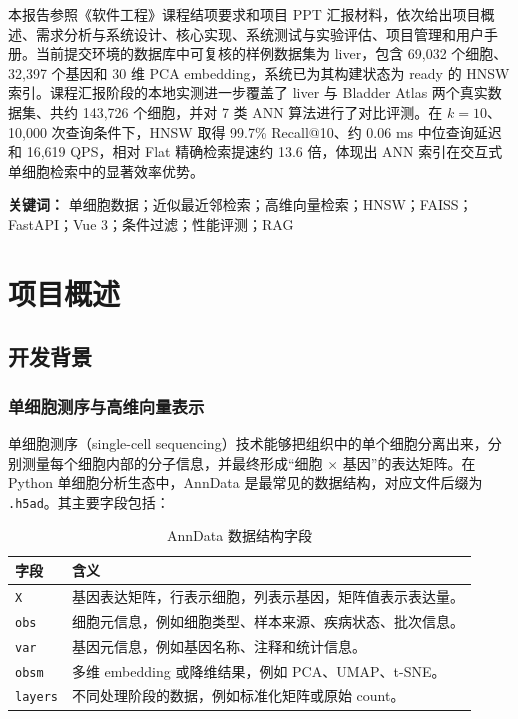 \documentclass[UTF8,a4paper,12pt]{ctexrep}
\begin{document}
本报告参照《软件工程》课程结项要求和项目 PPT 汇报材料，依次给出项目概述、需求分析与系统设计、核心实现、系统测试与实验评估、项目管理和用户手册。当前提交环境的数据库中可复核的样例数据集为 liver，包含 69,032 个细胞、32,397 个基因和 30 维 PCA embedding，系统已为其构建状态为 ready 的 HNSW 索引。课程汇报阶段的本地实测进一步覆盖了 liver 与 Bladder Atlas 两个真实数据集、共约 143,726 个细胞，并对 7 类 ANN 算法进行了对比评测。在 $k=10$、10,000 次查询条件下，HNSW 取得 99.7\% Recall@10、约 0.06 ms 中位查询延迟和 16,619 QPS，相对 Flat 精确检索提速约 13.6 倍，体现出 ANN 索引在交互式单细胞检索中的显著效率优势。

\textbf{关键词：} 单细胞数据；近似最近邻检索；高维向量检索；HNSW；FAISS；FastAPI；Vue 3；条件过滤；性能评测；RAG

\tableofcontents
\clearpage
{}

\chapter{项目概述}

\section{开发背景}

\subsection{单细胞测序与高维向量表示}

单细胞测序（single-cell sequencing）技术能够把组织中的单个细胞分离出来，分别测量每个细胞内部的分子信息，并最终形成``细胞 $\times$ 基因''的表达矩阵。在 Python 单细胞分析生态中，AnnData 是最常见的数据结构，对应文件后缀为 \texttt{.h5ad}。其主要字段包括：

\begin{table}[H]
  \centering
  \caption{AnnData 数据结构字段}
  \begin{tabularx}{0.92\textwidth}{lY}
    \toprule
    字段 & 含义 \\
    \midrule
    \texttt{X} & 基因表达矩阵，行表示细胞，列表示基因，矩阵值表示表达量。 \\
    \texttt{obs} & 细胞元信息，例如细胞类型、样本来源、疾病状态、批次信息。 \\
    \texttt{var} & 基因元信息，例如基因名称、注释和统计信息。 \\
    \texttt{obsm} & 多维 embedding 或降维结果，例如 PCA、UMAP、t-SNE。 \\
    \texttt{layers} & 不同处理阶段的数据，例如标准化矩阵或原始 count。 \\
    \bottomrule
  \end{tabularx}
\end{table}
\end{document}
